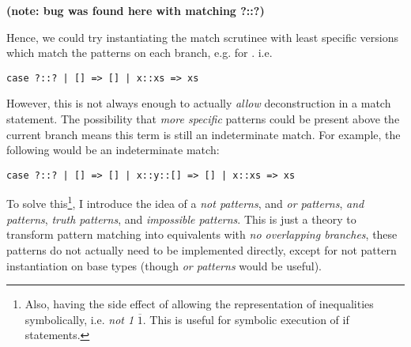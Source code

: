 \textbf{(note: bug was found here with matching ?::?)}

Hence, we could try instantiating the match scrutinee with least specific versions which match the patterns on each branch, e.g.  for . i.e. 

\texttt{case ?::? | [] => [] | x::xs => xs}

However, this is not always enough to actually \textit{allow} deconstruction in a match statement. The possibility that \textit{more specific} patterns could be present above the current branch means this term is still an indeterminate match. For example, the following would be an indeterminate match:

\texttt{case ?::? | [] => [] | x::y::[] => [] | x::xs => xs}

To solve this\footnote{Also, having the side effect of allowing the representation of inequalities symbolically, i.e. \textit{not 1} $\overline{1}$. This is useful for symbolic execution of if statements.}, I introduce the idea of a \textit{not patterns}, and \textit{or patterns}, \textit{and patterns}, \textit{truth patterns}, and \textit{impossible patterns}. This is just a theory to transform pattern matching into equivalents with \textit{no overlapping branches}, these patterns do not actually need to be implemented directly, except for not pattern instantiation on base types (though \textit{or patterns} would be useful).

